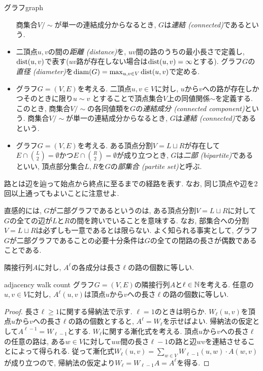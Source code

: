 \begin{definition}{グラフ}{graph}
\begin{itemize}
          商集合$V / \sim$が単一の連結成分からなるとき, $G$は\emph{連結 (connected)}であるという.
    \item 二頂点$u,v$の間の\emph{距離 (distance)}を, $uv$間の路のうちの最小長さで定義し, $\mathrm{dist}(u,v)$で表す($uv$路が存在しない場合は$\mathrm{dist}(u,v)=\infty$とする). グラフ$G$の\emph{直径 (diameter)}を$\mathrm{diam}(G)=\max_{u,v\in V}\mathrm{dist}(u,v)$で定める.
    \item グラフ$G=(V,E)$を考える.
          二頂点$u,v \in V$に対し,
          $u$から$v$への路が存在しかつそのときに限り$u\sim v$
          とすることで頂点集合$V$上の同値関係$\sim$を定義する.
          このとき, 商集合$V / \sim$の各同値類を$G$の\emph{連結成分 (connected component)}という.
          商集合$V / \sim$が単一の連結成分からなるとき, $G$は\emph{連結 (connected)}であるという.
    \item   グラフ$G=(V,E)$を考える.
          ある頂点分割$V=L\sqcup R$が存在して$E\cap \binom{L}{2}=\emptyset$かつ$E\cap \binom{R}{2}=\emptyset$が成り立つとき, $G$は\emph{二部 (bipartite)}であるといい,
          頂点部分集合$L,R$を$G$の\emph{部集合 (partite set)}と呼ぶ.
  \end{itemize}
\end{definition}
路とは辺を辿って始点から終点に至るまでの経路を表す.
なお, 同じ頂点や辺を2回以上通ってもよいことに注意せよ.

直感的には, $G$が二部グラフであるというのは, ある頂点分割$V=L\sqcup R$に対して
$G$の全ての辺が$L$と$R$の間を跨いでいることを意味する.
なお, 部集合への分割$V = L\sqcup R$は必ずしも一意であるとは限らない.
よく知られる事実として, グラフ$G$が二部グラフであることの必要十分条件は$G$の全ての閉路の長さが偶数であることである.

隣接行列$A$に対し, $A^\ell$の各成分は長さ$\ell$の路の個数に等しい.
\begin{lemma}{}{adjacency walk count}
  グラフ$G=(V,E)$の隣接行列$A$と$\ell\in\mathbb{N}$を考える.
  任意の$u,v\in V$に対し, $A^\ell(u,v)$は頂点$u$から$v$への長さ$\ell$の路の個数に等しい.
\end{lemma}
\begin{proof}
  長さ$\ell\ge 1$に関する帰納法で示す. $\ell=1$のときは明らか.
  $W_\ell(u,v)$を頂点$u$から$v$への長さ$\ell$の路の個数とすると, $A^\ell = W_\ell$を示せばよい.
  帰納法の仮定として$A^{\ell - 1} = W_{\ell - 1}$とする.
  $W_{\ell}$に関する漸化式を考える.
  頂点$u$から$v$への長さ$\ell$の任意の路は,
  ある$w\in V$に対して$uw$間の長さ$\ell-1$の路と辺$wv$を連結させることによって得られる.
  従って漸化式$W_\ell(u,v) = \sum_{w \in V} W_{\ell-1}(u,w) \cdot A(w,v)$が成り立つので, 帰納法の仮定より$W_\ell = W_{\ell-1}A = A^\ell$を得る.
\end{proof}

